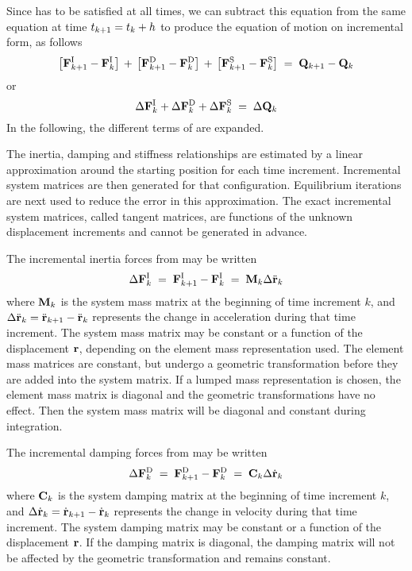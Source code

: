 Since  has to be satisfied at all times, we can subtract
this equation from the same equation at time $t_\kp1=t_k+h$ to produce the
equation of motion on incremental form, as follows
%
\begin{equation}
\left[ \Fi_\kp1 - \Fi_k \right] \,+\,
\left[ \Fd_\kp1 - \Fd_k \right] \,+\,
\left[ \Fs_\kp1 - \Fs_k \right] \;=\; \Q_\kp1 - \Q_k
\end{equation}
%
or
%
\begin{equation}
\Delta{\bf F}^{\rm I}_k + \Delta{\bf F}^{\rm D}_k + \Delta{\bf F}^{\rm S}_k \;=\; \Delta{\bf Q}_k
\label{eq:DynEquilIncForm}
\end{equation}
%
In the following,
the different terms of  are expanded.

The inertia, damping and stiffness relationships are estimated by a linear
approximation around the starting position for each time increment.
Incremental system matrices are then generated for that configuration.
Equilibrium iterations are next used to reduce the error in this approximation.
The exact incremental system matrices, called tangent matrices, are functions
of the unknown displacement increments and cannot be generated in advance.

The incremental inertia forces from  may be written
%
\begin{equation}
\Delta\Fi_k \;=\; \Fi_\kp1 - \Fi_k \;=\; {\mf M}_k \Delta\ddot{\mf r}_k
\label{eq:37}
\end{equation}
%
where ${\bf M}_k$ is the system mass matrix at the beginning of time
increment $k$, and $\Delta\ddot{\mf r}_k = \ddot{\mf r}_\kp1 - \ddot{\mf r}_k$
represents the change in acceleration during that time increment.
The system mass matrix may be constant or a function of the displacement
${\bf r}$, depending on the element mass representation used.
The element mass matrices are constant, but undergo a geometric transformation
before they are added into the system matrix.
If a lumped mass representation is chosen, the element mass matrix is diagonal
and the geometric transformations have no effect.
Then the system mass matrix will be diagonal and constant during integration.

The incremental damping forces from  may be written
%
\begin{equation}
\Delta\Fd_k \;=\; \Fd_\kp1 - \Fd_k \;=\; {\mf C}_k \Delta\dot{\mf r}_k
\label{eq:38}
\end{equation}
%
where ${\bf C}_k$ is the system damping matrix at the beginning of time
increment $k$, and $\Delta\dot{\mf r}_k = \dot{\mf r}_\kp1 - \dot{\mf r}_k$
represents the change in velocity during that time increment.
The system damping matrix may be constant or a function of the displacement
${\bf r}$.
If the damping matrix is diagonal, the damping matrix will not be affected by
the geometric transformation and remains constant.

